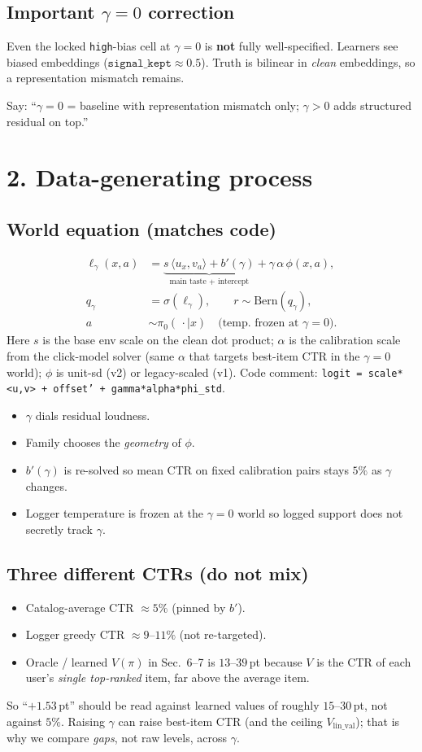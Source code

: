 \documentclass[11pt]{article}
\newcommand{\phonesection}[1]{\Needspace{8\baselineskip}\section*{#1}}
\newcommand{\phonesub}[1]{\Needspace{6\baselineskip}\subsection*{#1}}
\begin{document}
\phonesub{Important $\gamma{=}0$ correction}
Even the locked \texttt{high}-bias cell at
$\gamma{=}0$ is \textbf{not} fully
well-specified.  Learners see biased
embeddings ($\texttt{signal\_kept}\approx 0.5$).
Truth is bilinear in \emph{clean} embeddings,
so a representation mismatch remains.

Say: ``$\gamma{=}0$ = baseline with
representation mismatch only; $\gamma{>}0$
adds structured residual on top.''

\phonesection{2. Data-generating process}

\phonesub{World equation (matches code)}
\begin{align*}
\ell_{\gamma}(x,a)
  &= \underbrace{s\,\langle u_x, v_a\rangle
     + b'(\gamma)}_{\text{main taste + intercept}}
     + \gamma\,\alpha\,\phi(x,a),\\
q_{\gamma}
  &= \sigma(\ell_{\gamma}),\qquad
r\sim\mathrm{Bern}(q_{\gamma}),\\
a &\sim \pi_0(\,\cdot\mid x)
  \quad\text{(temp.\ frozen at $\gamma{=}0$)}.
\end{align*}
Here $s$ is the base env scale on the clean
dot product; $\alpha$ is the calibration
scale from the click-model solver (same
$\alpha$ that targets best-item CTR in the
$\gamma{=}0$ world); $\phi$ is unit-sd (v2)
or legacy-scaled (v1).  Code comment:
\texttt{logit = scale*<u,v> + offset'
+ gamma*alpha*phi\_std}.

\begin{itemize}
  \item $\gamma$ dials residual loudness.
  \item Family chooses the \emph{geometry}
        of $\phi$.
  \item $b'(\gamma)$ is re-solved so mean
        CTR on fixed calibration pairs stays
        $5\%$ as $\gamma$ changes.
  \item Logger temperature is frozen at the
        $\gamma{=}0$ world so logged support
        does not secretly track $\gamma$.
\end{itemize}

\phonesub{Three different CTRs (do not mix)}
\begin{itemize}
  \item Catalog-average CTR $\approx 5\%$
        (pinned by $b'$).
  \item Logger greedy CTR $\approx 9$--$11\%$
        (not re-targeted).
  \item Oracle / learned $V(\pi)$ in
        Sec.~6--7 is $13$--$39$\,pt because
        $V$ is the CTR of each user's
        \emph{single top-ranked} item, far
        above the average item.
\end{itemize}
So ``$+1.53$\,pt'' should be read against
learned values of roughly $15$--$30$\,pt,
not against $5\%$.  Raising $\gamma$ can raise
best-item CTR (and the ceiling
$V_{\mathrm{lin\_val}}$); that is why we
compare \emph{gaps}, not raw levels, across
$\gamma$.
\end{document}
